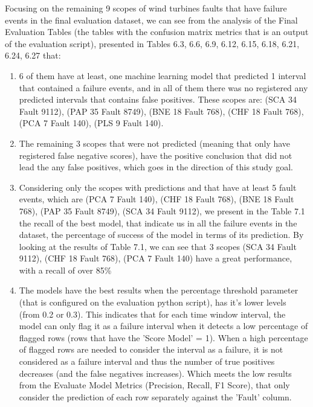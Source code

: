 Focusing on the remaining 9 scopes of wind turbines faults that have failure events in the final evaluation dataset, we can see from the analysis of the Final Evaluation Tables (the tables with the confusion matrix metrics that is an output of the evaluation script), presented in Tables 6.3, 6.6, 6.9, 6.12, 6.15, 6.18, 6.21, 6.24, 6.27 that:
\begin{enumerate}
    \item
6 of them have at least, one machine learning model that predicted 1 interval that contained a failure events, and in all of them there was no registered any predicted intervals that contains false positives.
These scopes are: (SCA 34 Fault 9112), (PAP 35 Fault 8749), (BNE 18 Fault 768), (CHF 18 Fault 768), (PCA 7 Fault 140), (PLS 9 Fault 140).
    \item
The remaining 3 scopes that were not predicted (meaning that only have registered false negative scores), have the positive conclusion that did not lead the any false positives, which goes in the direction of this study goal.
    \item
Considering only the scopes with predictions and that have at least 5 fault events, which are (PCA 7 Fault 140), (CHF 18 Fault 768), (BNE 18 Fault 768), (PAP 35 Fault 8749), (SCA 34 Fault 9112), we present in the Table 7.1 the recall of the best model, that indicate us in all the failure events in the dataset, the percentage of success of the model in terms of its prediction.
By looking at the results of Table 7.1, we can see that 3 scopes (SCA 34 Fault 9112), (CHF 18 Fault 768), (PCA 7 Fault 140) have a great performance, with a recall of over 85\%
    \item
The models have the best results when the percentage threshold parameter (that is configured on the evaluation python script), has it's lower levels (from 0.2 or 0.3). This indicates that for each time window interval, the model can only flag it as a failure interval when it detects a low percentage of flagged rows (rows that have the 'Score Model' = 1). When a high percentage of flagged rows are needed to consider the interval as a failure, it is not considered as a failure interval and thus the number of true positives decreases (and the false negatives increases). 
Which meets the low results from the Evaluate Model Metrics (Precision, Recall, F1 Score), that only consider the prediction of each row separately against the 'Fault' column.
\end{enumerate}

